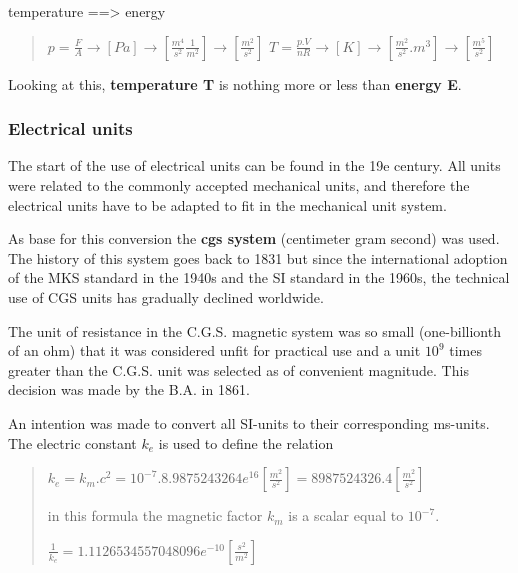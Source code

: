 \documentclass[]{article}
\begin{document}
temperature ==\textgreater{} energy

\begin{quote}
\(p=\frac{F}{A} \rightarrow [Pa] \rightarrow [\frac{m^4}{s^2}\frac{1}{m^2}] \rightarrow [\frac{m^2}{s^2}]\)
\(T= \frac{p.V}{nR} \rightarrow [K] \rightarrow [\frac{m^2}{s^2}.m^3] \rightarrow [\frac{m^5}{s^2}]\)
\end{quote}

Looking at this, \textbf{temperature T} is nothing more or less than
\textbf{energy E}.

\hypertarget{header-n37}{%
\subsubsection{Electrical units}\label{header-n37}}

The start of the use of electrical units can be found in the 19e
century. All units were related to the commonly accepted mechanical
units, and therefore the electrical units have to be adapted to fit in
the mechanical unit system.

As base for this conversion the \textbf{cgs system} (centimeter gram
second) was used. The history of this system goes back to 1831 but since
the international adoption of the MKS standard in the 1940s and the SI
standard in the 1960s, the technical use of CGS units has gradually
declined worldwide.

The unit of resistance in the C.G.S. magnetic system was so small
(one-billionth of an ohm) that it was considered unfit for practical use
and a unit \(10^9\) times greater than the C.G.S. unit was selected as
of convenient magnitude. This decision was made by the B.A. in 1861.

An intention was made to convert all SI-units to their corresponding
ms-units. The electric constant \(k_e\) is used to define the relation

\begin{quote}
\(k_e = k_m.c^2 = 10^{-7}.8.9875243264e^{16} [\frac{m^2}{s^2}] = 8987524326.4 [\frac{m^2}{s^2}]\)

in this formula the magnetic factor \(k_m\) is a scalar equal to
\(10^{-7}\).

\(\frac{1}{k_e}= 1.1126534557048096e^{-10} [\frac{s^2}{m^2}]\)
\end{quote}
\end{document}
